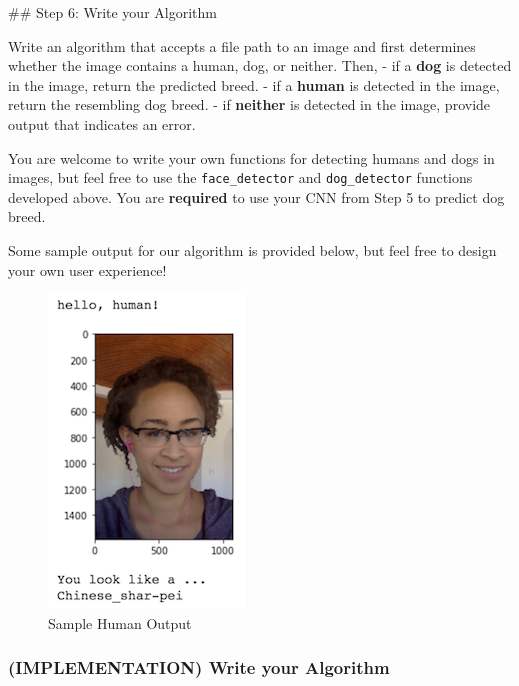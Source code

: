 \documentclass[11pt]{article}
\makeatletter
\def\maxwidth{\ifdim\Gin@nat@width>\linewidth\linewidth
    \else\Gin@nat@width\fi}
\let\Oldincludegraphics\includegraphics
\renewcommand{\includegraphics}[1]{\Oldincludegraphics[width=.8\maxwidth]{#1}}
\makeatother
\begin{document}
 \#\# Step 6: Write your Algorithm

Write an algorithm that accepts a file path to an image and first
determines whether the image contains a human, dog, or neither. Then, -
if a \textbf{dog} is detected in the image, return the predicted breed.
- if a \textbf{human} is detected in the image, return the resembling
dog breed. - if \textbf{neither} is detected in the image, provide
output that indicates an error.

You are welcome to write your own functions for detecting humans and
dogs in images, but feel free to use the \texttt{face\_detector} and
\texttt{dog\_detector} functions developed above. You are
\textbf{required} to use your CNN from Step 5 to predict dog breed.

Some sample output for our algorithm is provided below, but feel free to
design your own user experience!

\begin{figure}
\centering
\includegraphics{images/sample_human_output.png}
\caption{Sample Human Output}
\end{figure}

\subsubsection{(IMPLEMENTATION) Write your
Algorithm}\label{implementation-write-your-algorithm}
\end{document}
